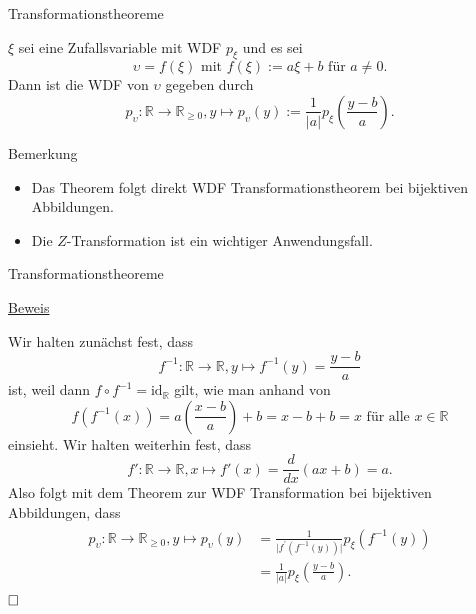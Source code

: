 \documentclass[
  8pt,
  ignorenonframetext,
]{beamer}
\providecommand{\tightlist}{%
  \setlength{\itemsep}{0pt}\setlength{\parskip}{0pt}}
\newcommand{\ups}{\upsilon}
\begin{document}
\begin{frame}{Transformationstheoreme}
\protect\hypertarget{transformationstheoreme-3}{}
\small
\begin{theorem}
\normalfont
\justifying
$\xi$ sei eine Zufallsvariable mit WDF $p_\xi$ und es sei
\begin{equation}
\ups = f(\xi) \mbox{ mit } f(\xi) := a\xi + b \mbox{ für } a\neq 0.
\end{equation}
Dann ist die WDF von $\ups$ gegeben durch
\begin{equation}
p_\ups : \mathbb{R} \to \mathbb{R}_{\ge 0}, y \mapsto p_\ups(y) :=
\frac{1}{|a|}p_\xi\left(\frac{y-b}{a}\right).
\end{equation}
\end{theorem}

Bemerkung

\begin{itemize}
\tightlist
\item
  Das Theorem folgt direkt WDF Transformationstheorem bei bijektiven
  Abbildungen.
\item
  Die \(Z\)-Transformation ist ein wichtiger Anwendungsfall.
\end{itemize}
\end{frame}

\begin{frame}{Transformationstheoreme}
\protect\hypertarget{transformationstheoreme-4}{}
\footnotesize

\underline{Beweis} \vspace{1mm}

Wir halten zunächst fest, dass \begin{equation}
f^{-1} : \mathbb{R} \to \mathbb{R}, y  \mapsto f^{-1}(y) = \frac{y - b}{a}
\end{equation} ist, weil dann
\(f \circ f^{-1} = \mbox{id}_{\mathbb{R}}\) gilt, wie man anhand von
\begin{equation}
f(f^{-1}(x)) = a \left(\frac{x - b}{a}\right) + b = x - b + b = x \mbox{ für alle } x \in \mathbb{R}
\end{equation} einsieht. Wir halten weiterhin fest, dass
\begin{equation}
f' : \mathbb{R} \to \mathbb{R}, x \mapsto f'(x) = \frac{d}{dx}(ax  + b) = a.
\end{equation} Also folgt mit dem Theorem zur WDF Transformation bei
bijektiven Abbildungen, dass \begin{align}
\begin{split}
p_\ups : \mathbb{R} \to \mathbb{R}_{\ge 0}, y \mapsto p_\ups(y)
& = \frac{1}{\vert f^{'}\left(f^{-1}(y)\right)\vert}p_\xi\left(f^{-1}(y)\right) \\
& = \frac{1}{|a|}p_\xi\left(\frac{y - b}{a}\right).
\end{split}
\end{align} \(\hfill \Box\)
\end{frame}
\end{document}
